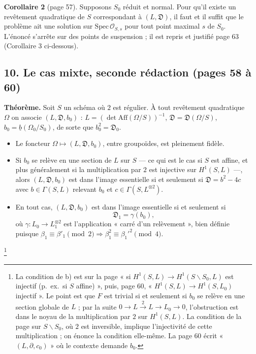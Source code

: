 \documentclass[11pt,a4paper]{article}
\begin{document}
\textbf{Corollaire 2} (page 57). Supposons $S_0$ réduit et normal. Pour qu'il existe un
revêtement quadratique de $S$ correspondant à $(L, \mathfrak{D})$, il faut et il suffit
que le problème ait une solution sur $\mathrm{Spec}\,\mathcal{O}_{S, s}$ pour tout point
maximal $s$ de $S_0$. L'énoncé s'arrête sur des points de suspension ; il est repris
et justifié page 63 (Corollaire 3 ci-dessous).

\subsection*{10. Le cas mixte, seconde rédaction (pages 58 à 60)}

\textbf{Théorème.} Soit $S$ un schéma où $2$ est régulier. À tout revêtement
quadratique $\Omega$ on associe $(L, \mathfrak{D}, b_0)$ : $L = (\det
\mathrm{Aff}(\Omega/S))^{-1}$, $\mathfrak{D} = \mathfrak{D}(\Omega/S)$, $b_0 =
\underline{b}(\Omega_0/S_0)$, de sorte que $b_0^2 = \mathfrak{D}_0$.
\begin{itemize}
  \item[a)] Le foncteur $\Omega \mapsto (L, \mathfrak{D}, b_0)$, entre groupoïdes, est
    pleinement fidèle.
  \item[b)] Si $b_0$ se relève en une section de $L$ sur $S$ — ce qui est le cas si $S$
    est affine, et plus généralement si la multiplication par $2$ est injective sur
    $H^1(S, L)$ —, alors $(L, \mathfrak{D}, b_0)$ est dans l'image essentielle si et
    seulement si $\mathfrak{D} = b^2 - 4c$ avec $b \in \Gamma(S, L)$ relevant $b_0$ et $c
    \in \Gamma(S, L^{\otimes 2})$.
  \item[c)] En tout cas, $(L, \mathfrak{D}, b_0)$ est dans l'image essentielle si et
    seulement si
    \[
      \mathfrak{D}_1 = \gamma(b_0),
    \]
    où $\gamma : L_0 \to L_1^{\otimes 2}$ est l'application « carré d'un relèvement »,
    bien définie puisque $\beta_1 \equiv \beta'_1 \pmod 2 \Rightarrow \beta_1^2 \equiv
    \beta_1'^2 \pmod 4$.
\end{itemize}
\footnote{La condition de b) est sur la page « si $H^1(S, L) \to H^1(S \smallsetminus
S_0, L)$ est injectif (p.\ ex.\ si $S$ affine) », puis, page 60, « $H^1(S, L) \to
H^1(S, L_0)$ injectif ». Le point est que $F$ est trivial si et seulement si $b_0$ se
relève en une section globale de $L$ ; par la suite $0 \to L \xrightarrow{2} L \to L_0
\to 0$, l'obstruction est dans le noyau de la multiplication par $2$ sur $H^1(S, L)$.
La condition de la page sur $S \smallsetminus S_0$, où $2$ est inversible, implique
l'injectivité de cette multiplication ; on énonce la condition elle-même. La page 60
écrit « $(L, \partial, c_0)$ » où le contexte demande $b_0$.}
\end{document}
